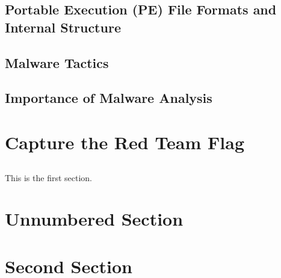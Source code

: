 \documentclass{article}
\begin{document}
\subsection{Portable Execution (PE) File Formats and Internal Structure}
\subsection{Malware Tactics}
\subsection{Importance of Malware Analysis}
\section{Capture the Red Team Flag}



















\subsection{}

This is the first section.

\blindtext

\section*{Unnumbered Section}

\blindtext

\section{Second Section}

\blindtext
\end{document}
